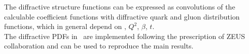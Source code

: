 The diffractive structure functions can be expressed as convolutions of the
calculable coefficient functions with diffractive quark and gluon distribution functions,
 which in general depend on \xpom, $Q^2$, $\beta$, $t$.
\\
The diffractive PDFs in \fitter\ are implemented following the prescription of ZEUS
collaboration \cite{zeus:diff2009} and can be used to reproduce the main results.
%
